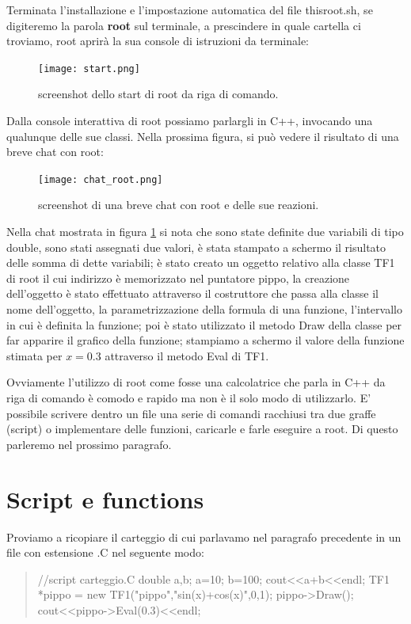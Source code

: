 \documentclass[11pt,fleqn]{book} %
\begin{document}
Terminata l'installazione e l'impostazione automatica del file thisroot.sh, se digiteremo la parola \textbf{root} sul terminale, a prescindere in quale cartella ci troviamo, root aprirà la sua console di istruzioni da terminale:

\begin{figure}[h]
\centering
\texttt{[image: start.png]}
\caption{screenshot dello start di root da riga di comando.}
\end{figure}

Dalla console interattiva di root possiamo parlargli in C++, invocando una qualunque delle sue classi. Nella prossima figura, si può vedere il risultato di una breve chat con root:

\begin{figure}[h]
\centering
\texttt{[image: chat\_root.png]}
\caption{screenshot di una breve chat con root e delle sue reazioni.\label{chat}}
\end{figure}

Nella chat mostrata in figura \ref{chat} si nota che sono state definite due variabili di tipo double, sono stati assegnati due valori, è stata stampato a schermo il risultato delle somma di dette variabili; è stato creato un oggetto relativo alla classe TF1 di root il cui indirizzo è memorizzato nel puntatore pippo, la creazione dell'oggetto è stato effettuato attraverso il costruttore che passa alla classe il nome dell'oggetto, la parametrizzazione della formula di una funzione, l'intervallo in cui è definita la funzione; poi è stato utilizzato il metodo Draw della classe per far apparire il grafico della funzione; stampiamo a schermo il valore della funzione stimata per $x=0.3$ attraverso il metodo Eval di TF1.

Ovviamente l'utilizzo di root come fosse una calcolatrice che parla in C++ da riga di comando è comodo e rapido ma non è il solo modo di utilizzarlo.
E' possibile scrivere dentro un file una serie di comandi racchiusi tra due graffe (script) o implementare delle funzioni, caricarle e farle eseguire a root. Di questo parleremo nel prossimo paragrafo. 


\section{Script e functions}

Proviamo a ricopiare il carteggio di cui parlavamo nel paragrafo precedente in un file con estensione .C nel seguente modo:

\begin{verse}
//script carteggio.C
{
double a,b;
a=10; b=100;
cout<<a+b<<endl;
TF1 *pippo = new TF1("pippo","sin(x)+cos(x)",0,1);
pippo->Draw();
cout<<pippo->Eval(0.3)<<endl;
}
\end{verse}
\end{document}

